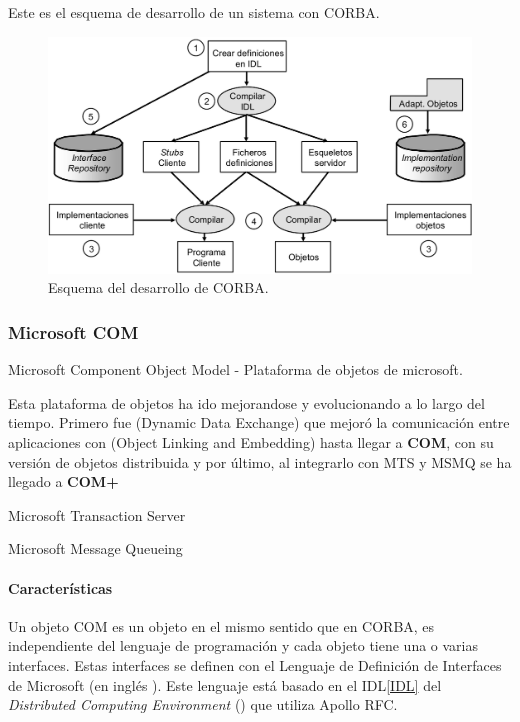 Este es el esquema de desarrollo de un sistema con CORBA.


\begin{figure}[hbtp]
\centering
\includegraphics[width=1\textwidth]{img/CORBA.png}
\caption{Esquema del desarrollo de CORBA.}
\label{OMA}
\end{figure}


\subsubsection{Microsoft COM}

\begin{defn}
	Microsoft Component Object Model - Plataforma de objetos de microsoft.
\end{defn}

Esta plataforma de objetos ha ido mejorandose y evolucionando a lo largo del tiempo. Primero fue  (Dynamic Data Exchange) que mejoró la comunicación entre aplicaciones con  (Object Linking and Embedding) hasta llegar a \textbf{COM}, con su versión de objetos distribuida  y por último, al integrarlo con MTS y MSMQ se ha llegado a \textbf{COM+}

\begin{defn}[MTS]
	Microsoft Transaction Server
\end{defn}

\begin{defn}[MSMQ]
	Microsoft Message Queueing
\end{defn}

\paragraph{Características}
Un objeto COM es un objeto en el mismo sentido que en CORBA,  es independiente del lenguaje de programación y cada objeto tiene una o varias interfaces. Estas interfaces se definen con el Lenguaje de Definición de Interfaces de Microsoft (en inglés ). Este lenguaje está basado en el IDL\ref{IDL} del \textit{Distributed Computing Environment} () que utiliza Apollo RFC.

